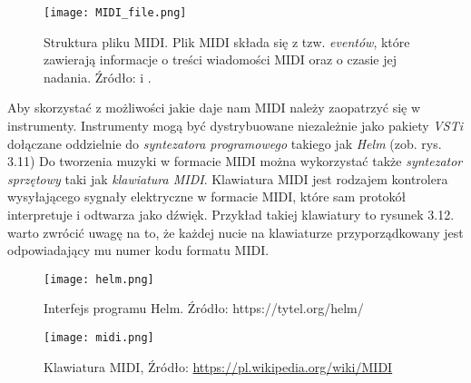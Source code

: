 \begin{figure}[H]\texttt{[image: MIDI\_file.png]}
\centering
\caption{Struktura pliku MIDI. Plik MIDI składa się z tzw. \textit{eventów}, które zawierają informacje o treści wiadomości MIDI oraz o czasie jej nadania. Źródło: \citep[s. 2 - 3]{MIDI_Format} i \citep{Tse2008}.}
\end{figure}

Aby skorzystać z możliwości jakie daje nam MIDI należy zaopatrzyć się w instrumenty. Instrumenty mogą być dystrybuowane niezależnie jako pakiety \textit{VSTi} dołączane oddzielnie do \textit{syntezatora programowego} takiego jak \textit{Helm} (zob. rys. 3.11)
Do tworzenia muzyki w formacie MIDI można wykorzystać także \textit{syntezator sprzętowy} taki jak \textit{klawiatura MIDI}. Klawiatura MIDI jest rodzajem kontrolera wysyłającego sygnały elektryczne w formacie MIDI, które sam protokół interpretuje i odtwarza jako dźwięk. Przykład takiej klawiatury to rysunek 3.12. warto zwrócić uwagę na to, że każdej nucie na klawiaturze przyporządkowany jest odpowiadający mu numer kodu formatu MIDI.

\begin{figure}[H]
\centering
\texttt{[image: helm.png]}
\centering
\caption{Interfejs programu Helm. Źródło: https://tytel.org/helm/}
\end{figure}


\begin{figure}[H]
\begin{center}
\texttt{[image: midi.png]}
\centering
\caption{Klawiatura MIDI, Źródło: \href{https://pl.wikipedia.org/wiki/MIDI}{https://pl.wikipedia.org/wiki/MIDI}}
\centering
\end{center}
\end{figure}
 
